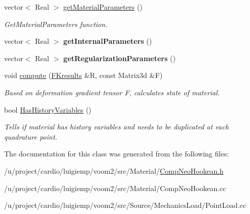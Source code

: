 \begin{DoxyCompactItemize}
\item 
\hypertarget{classvoom_1_1_comp_neo_hookean_a6b003412bbe4fdad93b104087d653553}{
vector$<$ Real $>$ \hyperlink{classvoom_1_1_comp_neo_hookean_a6b003412bbe4fdad93b104087d653553}{getMaterialParameters} ()}
\label{classvoom_1_1_comp_neo_hookean_a6b003412bbe4fdad93b104087d653553}

\begin{DoxyCompactList}\small\item\em GetMaterialParameters function. \item\end{DoxyCompactList}\item 
\hypertarget{classvoom_1_1_comp_neo_hookean_a3aec2497fa4680ed5ea3c59b8751a974}{
vector$<$ Real $>$ {\bfseries getInternalParameters} ()}
\label{classvoom_1_1_comp_neo_hookean_a3aec2497fa4680ed5ea3c59b8751a974}

\item 
\hypertarget{classvoom_1_1_comp_neo_hookean_a2e9e63896e3d00313ee65646fa867995}{
vector$<$ Real $>$ {\bfseries getRegularizationParameters} ()}
\label{classvoom_1_1_comp_neo_hookean_a2e9e63896e3d00313ee65646fa867995}

\item 
\hypertarget{classvoom_1_1_comp_neo_hookean_a0d6615827d8b6ba17f11879739b1524e}{
void \hyperlink{classvoom_1_1_comp_neo_hookean_a0d6615827d8b6ba17f11879739b1524e}{compute} (\hyperlink{structvoom_1_1_mechanics_material_1_1_f_kresults}{FKresults} \&R, const Matrix3d \&F)}
\label{classvoom_1_1_comp_neo_hookean_a0d6615827d8b6ba17f11879739b1524e}

\begin{DoxyCompactList}\small\item\em Based on deformation gradient tensor F, calculates state of material. \item\end{DoxyCompactList}\item 
\hypertarget{classvoom_1_1_comp_neo_hookean_a18903df0e0c9aba1a810d04904d9a287}{
bool \hyperlink{classvoom_1_1_comp_neo_hookean_a18903df0e0c9aba1a810d04904d9a287}{HasHistoryVariables} ()}
\label{classvoom_1_1_comp_neo_hookean_a18903df0e0c9aba1a810d04904d9a287}

\begin{DoxyCompactList}\small\item\em Tells if material has history variables and needs to be duplicated at each quadrature point. \item\end{DoxyCompactList}\end{DoxyCompactItemize}


The documentation for this class was generated from the following files:\begin{DoxyCompactItemize}
\item 
/u/project/cardio/luigiemp/voom2/src/Material/\hyperlink{_comp_neo_hookean_8h}{CompNeoHookean.h}\item 
/u/project/cardio/luigiemp/voom2/src/Material/CompNeoHookean.cc\item 
/u/project/cardio/luigiemp/voom2/src/Source/MechanicsLoad/PointLoad.cc\end{DoxyCompactItemize}
